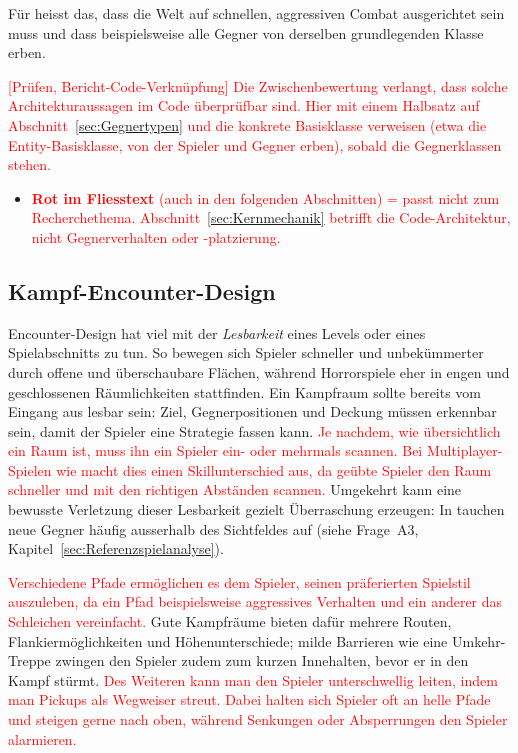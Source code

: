\documentclass[../Main.tex]{subfiles}
\begin{document}
Für  heisst das, dass die Welt auf schnellen, aggressiven Combat ausgerichtet sein muss und dass beispielsweise alle Gegner von derselben grundlegenden Klasse erben.\endgroup

\textcolor{red}{[Prüfen, Bericht-Code-Verknüpfung] Die Zwischenbewertung verlangt, dass solche Architekturaussagen im Code überprüfbar sind. Hier mit einem Halbsatz auf Abschnitt~\ref{sec:Gegnertypen} und die konkrete Basisklasse verweisen (etwa die Entity-Basisklasse, von der Spieler und Gegner erben), sobald die Gegnerklassen stehen.}

\begin{itemize}[leftmargin=1.5cm]
    \item \textcolor{red}{\textbf{Rot im Fliesstext} (auch in den folgenden Abschnitten) = passt nicht zum Recherchethema. Abschnitt~\ref{sec:Kernmechanik} betrifft die Code-Architektur, nicht Gegnerverhalten oder -platzierung.}
\end{itemize}

\subsection{Kampf-Encounter-Design} \label{sec:Encounter}
Encounter-Design hat viel mit der \textit{Lesbarkeit} eines Levels oder eines Spielabschnitts zu tun. So bewegen sich Spieler schneller und unbekümmerter durch offene und überschaubare Flächen, während Horrorspiele eher in engen und geschlossenen Räumlichkeiten stattfinden. Ein Kampfraum sollte bereits vom Eingang aus lesbar sein: Ziel, Gegnerpositionen und Deckung müssen erkennbar sein, damit der Spieler eine Strategie fassen kann.\autocite{gdc_horizonquests2018} \textcolor{red}{Je nachdem, wie übersichtlich ein Raum ist, muss ihn ein Spieler ein- oder mehrmals scannen. Bei Multiplayer-Spielen wie  macht dies einen Skillunterschied aus, da geübte Spieler den Raum schneller und mit den richtigen Abständen scannen.\autocite{totten2014architectural}} Umgekehrt kann eine bewusste Verletzung dieser Lesbarkeit gezielt Überraschung erzeugen: In  tauchen neue Gegner häufig ausserhalb des Sichtfeldes auf (siehe Frage~A3, Kapitel~\ref{sec:Referenzspielanalyse}).

\textcolor{red}{Verschiedene Pfade ermöglichen es dem Spieler, seinen präferierten Spielstil auszuleben, da ein Pfad beispielsweise aggressives Verhalten und ein anderer das Schleichen vereinfacht.\autocite{gdc_tenprinciples2010}} Gute Kampfräume bieten dafür mehrere Routen, Flankiermöglichkeiten und Höhenunterschiede; milde Barrieren wie eine Umkehr-Treppe zwingen den Spieler zudem zum kurzen Innehalten, bevor er in den Kampf stürmt.\autocite{gdc_horizonquests2018} \textcolor{red}{Des Weiteren kann man den Spieler unterschwellig leiten, indem man Pickups als Wegweiser streut. Dabei halten sich Spieler oft an helle Pfade und steigen gerne nach oben, während Senkungen oder Absperrungen den Spieler alarmieren.\autocite{rogers2014levelup}}
\end{document}
